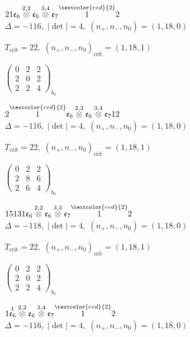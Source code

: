 \documentclass[10pt]{article}
\begin{document}
$21\mathfrak{e}_6\overset{2,2}{\otimes}\mathfrak{e}_6\overset{3,4}{\otimes}\mathfrak{e}_7\overset{\textcolor{red}{2}}{1}2$ \quad $\Delta=-116,\; |\det|=4,\; (n_+,n_-,n_0)=(1,18,0)$

\hspace{1em}$T_{\text{crit}}=22,\; (n_+,n_-,n_0)_{\text{crit}}=(1,18,1)$

\hspace{2em}$\left(\begin{smallmatrix}0 & 2 & 2 \\ 2 & 0 & 2 \\ 2 & 2 & 4\end{smallmatrix}\right)_{\!b_0}$

$2\overset{\textcolor{red}{2}}{1}\mathfrak{e}_6\overset{2,2}{\otimes}\mathfrak{e}_6\overset{3,4}{\otimes}\mathfrak{e}_712$ \quad $\Delta=-116,\; |\det|=4,\; (n_+,n_-,n_0)=(1,18,0)$

\hspace{1em}$T_{\text{crit}}=22,\; (n_+,n_-,n_0)_{\text{crit}}=(1,18,1)$

\hspace{2em}$\left(\begin{smallmatrix}0 & 2 & 2 \\ 2 & 8 & 6 \\ 2 & 6 & 4\end{smallmatrix}\right)_{\!b_0}$

\smallskip

$15131\mathfrak{e}_6\overset{2,2}{\otimes}\mathfrak{e}_6\overset{3,3}{\otimes}\mathfrak{e}_7\overset{\textcolor{red}{2}}{1}2$ \quad $\Delta=-118,\; |\det|=4,\; (n_+,n_-,n_0)=(1,18,0)$

\hspace{1em}$T_{\text{crit}}=22,\; (n_+,n_-,n_0)_{\text{crit}}=(1,18,1)$

\hspace{2em}$\left(\begin{smallmatrix}0 & 2 & 2 \\ 2 & 0 & 2 \\ 2 & 2 & 4\end{smallmatrix}\right)_{\!b_0}$

\smallskip

$1\overset{1}{\mathfrak{e}_6}\overset{2,2}{\otimes}\mathfrak{e}_6\overset{3,4}{\otimes}\mathfrak{e}_7\overset{\textcolor{red}{2}}{1}2$ \quad $\Delta=-116,\; |\det|=4,\; (n_+,n_-,n_0)=(1,18,0)$
\end{document}
